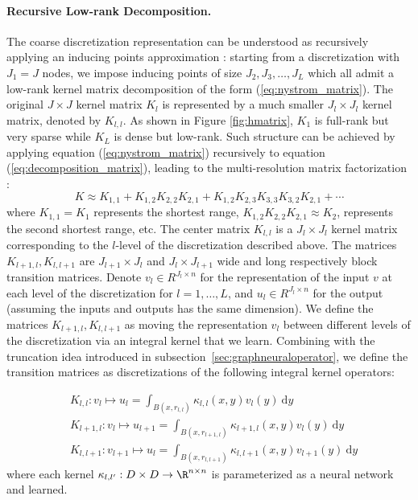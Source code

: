 \paragraph{Recursive Low-rank Decomposition.}
The coarse discretization representation can be understood as recursively applying an inducing points approximation \citep{quinonero2005aunifying}: starting from a discretization with $J_1 = J$ nodes, we impose inducing points of size $J_2, J_3,\dots, J_L$  which all admit a low-rank kernel matrix decomposition of the form (\ref{eq:nystrom_matrix}). 
The original $J \times J$ kernel matrix $K_l$ is represented by a much smaller $J_l \times J_l$ kernel matrix, denoted by $K_{l,l}$.
As shown in Figure \ref{fig:hmatrix},  $K_1$ is full-rank but very sparse while $K_L$ is dense but low-rank. Such structure can be achieved by applying equation (\ref{eq:nystrom_matrix}) recursively to equation (\ref{eq:decomposition_matrix}), leading to the multi-resolution matrix factorization \citep{kondor2014multiresolution}:
\begin{equation}\label{eq:hierarchy_decomposition}
K \approx K_{1,1} + K_{1,2}K_{2,2}K_{2,1} + K_{1,2}K_{2,3}K_{3,3}K_{3,2}K_{2,1} + \cdots
\end{equation}
where $ K_{1,1} = K_1$ represents the shortest range, $K_{1,2}K_{2,2}K_{2,1} \approx K_2$, represents the  second shortest range, etc. The center matrix $K_{l,l}$ is a $J_l \times J_l$ kernel matrix corresponding to the $l$-level of the discretization described above. The matrices $K_{l+1,l}, K_{l,l+1}$ are  $J_{l+1} \times J_l$ and $J_{l} \times J_{l+1}$  wide and long respectively block transition matrices. 
Denote $v_l \in R^{J_l \times n}$ for the representation of the input \(v\) at each level of the discretization for \(l=1,\dots,L\), and $u_l \in R^{J_l \times n}$ for the output (assuming the inputs and outputs has the same dimension). We define the matrices $K_{l+1,l}, K_{l,l+1}$ as moving the representation \(v_l\) between different levels of the discretization via an integral kernel that we learn. 
Combining with the truncation idea introduced in subsection~\ref{sec:graphneuraloperator}, we define the transition matrices as discretizations of the following integral kernel operators:

\begin{align}
\label{eq:all1}
&K_{l,l}: v_l \mapsto u_{l} = \int_{B(x,r_{l,l})} \kappa_{l,l}(x,y)v_l(y) \: \text{d}y \\ \label{eq:all2}
&K_{l+1,l}: v_l \mapsto u_{l+1} = \int_{B(x,r_{l+1,l})} \kappa_{l+1, l}(x,y)v_l(y) \: \text{d}y \\
\label{eq:all3}
&K_{l, l+1}: v_{l+1} \mapsto u_{l} = \int_{B(x,r_{l,l+1})} \kappa_{l,l+1}(x,y)v_{l+1}(y) \: \text{d}y 
\end{align}
where each kernel \(\kappa_{l,l'} : D \times D \to \R^{n \times n}\) is parameterized as a neural network and learned.

